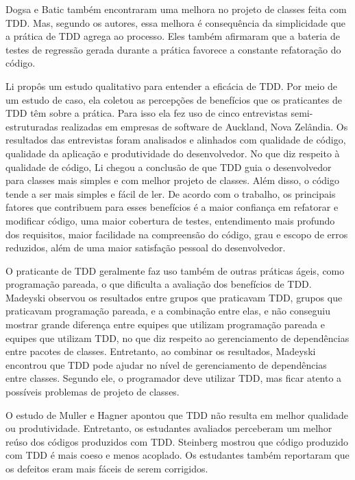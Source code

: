 \documentclass[conference]{IEEEtran}
\begin{document}
Dogsa e Batic \cite{dogsa-batic} também encontraram uma melhora no
projeto de classes feita com TDD. Mas, segundo os autores, essa melhora é 
consequência da simplicidade que a prática de TDD agrega ao processo. Eles
também  afirmaram que a bateria de testes de regressão gerada durante a prática 
favorece a constante refatoração do código.

Li \cite{angela-li} propôs um estudo qualitativo para
entender a eficácia de TDD. Por meio de um estudo de caso, ela coletou as 
percepções de benefícios que os praticantes de TDD têm sobre a prática. Para isso ela
fez uso de cinco entrevistas semi-estruturadas realizadas em empresas de software de 
Auckland, Nova Zelândia. Os resultados das entrevistas foram analisados e alinhados
com qualidade de código,
qualidade da aplicação e produtividade do desenvolvedor.
No que diz respeito à qualidade de código, Li chegou a conclusão de
que TDD guia o desenvolvedor para classes mais simples e com melhor projeto de classes. 
Além disso, o código tende a ser mais simples e fácil de ler.
De acordo com o trabalho, os principais fatores que contribuem para esses benefícios
é a maior confiança em refatorar e modificar código, uma maior cobertura de testes,
entendimento mais profundo dos requisitos, maior facilidade na compreensão do código,
grau e escopo de erros reduzidos, além de uma maior satisfação pessoal do desenvolvedor.

O praticante de TDD geralmente faz uso também de outras práticas ágeis, como
programação pareada, o que dificulta a avaliação dos benefícios
de TDD. Madeyski \cite{madeyski-package-dependencies} observou os resultados
entre grupos que praticavam TDD, grupos que praticavam programação pareada, 
e a combinação entre elas,
e não conseguiu mostrar grande diferença entre equipes que utilizam programação 
pareada e equipes que utilizam TDD, no que diz respeito ao gerenciamento de dependências entre 
pacotes de classes. Entretanto, ao combinar os resultados, Madeyski encontrou que TDD pode 
ajudar no nível de gerenciamento de dependências entre classes. Segundo ele, o 
programador deve utilizar TDD, mas ficar atento a possíveis problemas de projeto de classes.

O estudo de Muller e Hagner \cite{muller-e-hagner} apontou que TDD não resulta
em melhor qualidade ou produtividade. Entretanto, os estudantes avaliados perceberam um 
melhor reúso dos códigos produzidos com TDD. Steinberg \cite{steinberg} mostrou
que código produzido com TDD é mais coeso e menos acoplado. Os estudantes também
reportaram que os defeitos eram mais fáceis de serem corrigidos. 
\end{document}
